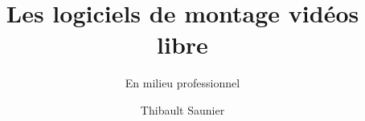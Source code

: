 \documentclass[a4paper,11pt]{article}
\begin{document}
\title{Les logiciels de montage vid\'eos libre}
\subtitle{En milieu professionnel}
\author{Thibault Saunier}
\withdate
\subject{Les logiciels de montage vid\'eos libre en milieu professionnel}
\maketitle



\tableofcontents






%





\end{document}
